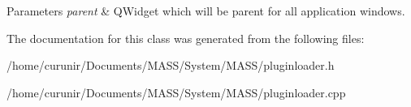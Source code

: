 \begin{DoxyParams}{Parameters}
{\em parent} & Q\+Widget which will be parent for all application windows. \\
\hline
\end{DoxyParams}


The documentation for this class was generated from the following files\+:\begin{DoxyCompactItemize}
\item 
/home/curunir/\+Documents/\+M\+A\+S\+S/\+System/\+M\+A\+S\+S/pluginloader.\+h\item 
/home/curunir/\+Documents/\+M\+A\+S\+S/\+System/\+M\+A\+S\+S/pluginloader.\+cpp\end{DoxyCompactItemize}
